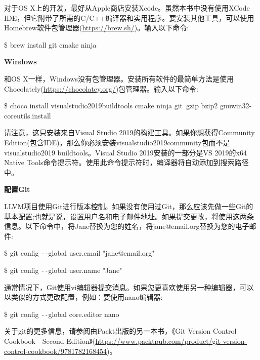 对于OS X上的开发，最好从Apple商店安装Xcode。虽然本书中没有使用XCode IDE，但它附带了所需的C/C++编译器和实用程序。要安装其他工具，可以使用Homebrew软件包管理器(\url{https://brew.sh/})。输入以下命令:\par

\begin{tcolorbox}[colback=white,colframe=black]
	\$ brew install git cmake ninja
\end{tcolorbox}

\hspace*{\fill} \par %
\textbf{Windows}

和OS X一样，Windows没有包管理器。安装所有软件的最简单方法是使用Chocolately(\url{https://chocolatey.org/})包管理器。输入以下命令:\par

\begin{tcolorbox}[colback=white,colframe=black]
\$ choco install visualstudio2019buildtools cmake ninja git\
	gzip bzip2 gnuwin32-coreutils.install
\end{tcolorbox}

请注意，这只安装来自Visual Studio 2019的构建工具。如果你想获得Community Edition(包含IDE)，那么你必须安装visualstudio2019community包而不是visualstudio2019 buildtools。Visual Studio 2019安装的一部分是VS 2019的x64 Native Tools命令提示符。使用此命令提示符时，编译器将自动添加到搜索路径中。\par

\hspace*{\fill} \par %
\textbf{配置Git}

LLVM项目使用Git进行版本控制。如果没有使用过Git，那么应该先做一些Git的基本配置;也就是说，设置用户名和电子邮件地址。如果提交更改，将使用这两条信息。以下命令中，将Jane替换为您的姓名，将jane@email.org替换为您的电子邮件:\par

\begin{tcolorbox}[colback=white,colframe=black]
	\$ git config \verb|--|global user.email "jane@email.org"
\end{tcolorbox}

\begin{tcolorbox}[colback=white,colframe=black]
	\$ git config \verb|--|global user.name "Jane"
\end{tcolorbox}

通常情况下，Git使用vi编辑器提交消息。如果您更喜欢使用另一种编辑器，可以以类似的方式更改配置，例如：要使用nano编辑器:\par

\begin{tcolorbox}[colback=white,colframe=black]
	\$ git config \verb|--|global core.editor nano
\end{tcolorbox}

关于git的更多信息，请参阅由Packt出版的另一本书，《Git Version Control Cookbook - Second Edition》(\url{https://www.packtpub.com/product/git-version-control-cookbook/9781782168454})。\par






